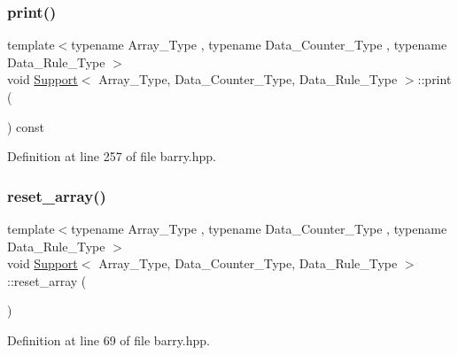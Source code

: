 \mbox{\label{classbarry_1_1_support_af87b2e85ec72e394387946023508e7fd}} 
\subsubsection{\texorpdfstring{print()}{print()}}
{\footnotesize\ttfamily template$<$typename Array\+\_\+\+Type , typename Data\+\_\+\+Counter\+\_\+\+Type , typename Data\+\_\+\+Rule\+\_\+\+Type $>$ \\
void \hyperlink{classbarry_1_1_support}{Support}$<$ Array\+\_\+\+Type, Data\+\_\+\+Counter\+\_\+\+Type, Data\+\_\+\+Rule\+\_\+\+Type $>$\+::print (\begin{DoxyParamCaption}{ }\end{DoxyParamCaption}) const\hspace{0.3cm}{\ttfamily [inline]}}



Definition at line 257 of file barry.\+hpp.

\mbox{\label{classbarry_1_1_support_a4f2860fd2e8e30703b91633a92ed7a58}} 
\subsubsection{\texorpdfstring{reset\+\_\+array()}{reset\_array()}\hspace{0.1cm}{\footnotesize\ttfamily [1/2]}}
{\footnotesize\ttfamily template$<$typename Array\+\_\+\+Type , typename Data\+\_\+\+Counter\+\_\+\+Type , typename Data\+\_\+\+Rule\+\_\+\+Type $>$ \\
void \hyperlink{classbarry_1_1_support}{Support}$<$ Array\+\_\+\+Type, Data\+\_\+\+Counter\+\_\+\+Type, Data\+\_\+\+Rule\+\_\+\+Type $>$\+::reset\+\_\+array (\begin{DoxyParamCaption}{ }\end{DoxyParamCaption})\hspace{0.3cm}{\ttfamily [inline]}}



Definition at line 69 of file barry.\+hpp.

\mbox{\label{classbarry_1_1_support_a6e39b22dfd1e0a0ceebf596c974f5326}} 
